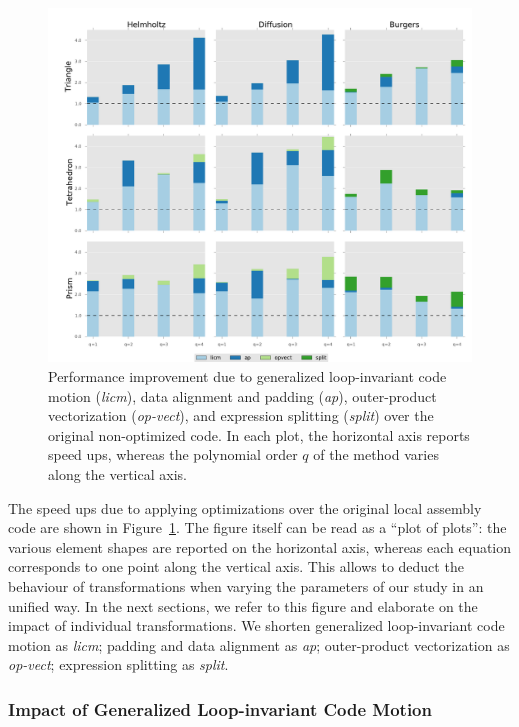 \begin{figure}[t]
\centerline{\includegraphics[scale=0.45]{coffee/perf-results/individual/graph}}
\caption{Performance improvement due to generalized loop-invariant code motion (\emph{licm}), data alignment and padding (\emph{ap}), outer-product vectorization (\emph{op-vect}), and expression splitting (\emph{split}) over the original non-optimized code. In each plot, the horizontal axis reports speed ups, whereas the polynomial order $q$ of the method varies along the vertical axis.}
\label{fig:coffee-individual-res}
\end{figure}

The speed ups due to applying optimizations over the original local assembly code are shown in Figure~\ref{fig:coffee-individual-res}. The figure itself can be read as a ``plot of plots'': the various element shapes are reported on the horizontal axis, whereas each equation corresponds to one point along the vertical axis. This allows to deduct the behaviour of transformations when varying the parameters of our study in an unified way. In the next sections, we refer to this figure and elaborate on the impact of individual transformations. We shorten generalized loop-invariant code motion as \emph{licm}; padding and data alignment as \emph{ap}; outer-product vectorization as \emph{op-vect}; expression splitting as \emph{split}.

\subsubsection{Impact of Generalized Loop-invariant Code Motion}
\label{sec:perf-eval-licm}

